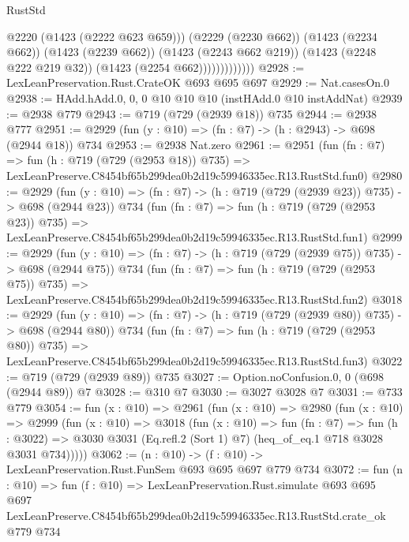 \begin{lexlean}{RustStd}
\begin{coremodule}
                            @2220
                            (@1423 (@2222 @623 @659)))
                          (@2229 (@2230 @662))
                          (@1423 (@2234 @662))
                          (@1423 (@2239 @662))
                          (@1423 (@2243 @662 @219))
                          (@1423 (@2248 @222 @219 @32))
                          (@1423 (@2254 @662)))))))))))))
@2928 := LexLeanPreservation.Rust.CrateOK @693 @695 @697
@2929 := Nat.casesOn.{0}
@2938 := HAdd.hAdd.{0, 0, 0} @10 @10 @10 (instHAdd.{0} @10 instAddNat)
@2939 := @2938 @779
@2943 := @719 (@729 (@2939 @18)) @735
@2944 := @2938 @777
@2951 := @2929 (fun (y : @10) => (fn : @7) -> (h : @2943) -> @698 (@2944 @18)) @734
@2953 := @2938 Nat.zero
@2961 := @2951
    (fun (fn : @7) =>
    fun (h : @719 (@729 (@2953 @18)) @735) =>
    LexLeanPreserve.C8454bf65b299dea0b2d19c59946335ec.R13.RustStd.fun0)
@2980 := @2929
    (fun (y : @10) => (fn : @7) -> (h : @719 (@729 (@2939 @23)) @735) -> @698 (@2944 @23))
    @734
    (fun (fn : @7) =>
    fun (h : @719 (@729 (@2953 @23)) @735) =>
    LexLeanPreserve.C8454bf65b299dea0b2d19c59946335ec.R13.RustStd.fun1)
@2999 := @2929
    (fun (y : @10) => (fn : @7) -> (h : @719 (@729 (@2939 @75)) @735) -> @698 (@2944 @75))
    @734
    (fun (fn : @7) =>
    fun (h : @719 (@729 (@2953 @75)) @735) =>
    LexLeanPreserve.C8454bf65b299dea0b2d19c59946335ec.R13.RustStd.fun2)
@3018 := @2929
    (fun (y : @10) => (fn : @7) -> (h : @719 (@729 (@2939 @80)) @735) -> @698 (@2944 @80))
    @734
    (fun (fn : @7) =>
    fun (h : @719 (@729 (@2953 @80)) @735) =>
    LexLeanPreserve.C8454bf65b299dea0b2d19c59946335ec.R13.RustStd.fun3)
@3022 := @719 (@729 (@2939 @89)) @735
@3027 := Option.noConfusion.{0, 0} (@698 (@2944 @89)) @7
@3028 := @310 @7
@3030 := @3027 @3028 @7
@3031 := @733 @779
@3054 := fun (x : @10) =>
  @2961
    (fun (x : @10) =>
    @2980
      (fun (x : @10) =>
      @2999
        (fun (x : @10) =>
        @3018
          (fun (x : @10) =>
          fun (fn : @7) =>
          fun (h : @3022) =>
          @3030 @3031 (Eq.refl.{2} (Sort 1) @7) (heq_of_eq.{1} @718 @3028 @3031 @734)))))
@3062 := (n : @10) -> (f : @10) -> LexLeanPreservation.Rust.FunSem @693 @695 @697 @779 @734
@3072 := fun (n : @10) =>
  fun (f : @10) =>
  LexLeanPreservation.Rust.simulate
    @693
    @695
    @697
    LexLeanPreserve.C8454bf65b299dea0b2d19c59946335ec.R13.RustStd.crate_ok
    @779
    @734
\end{coremodule}
\end{lexlean}
